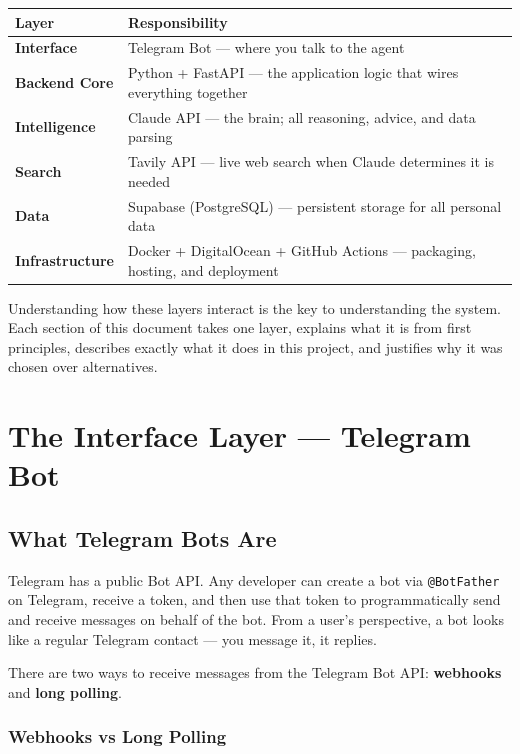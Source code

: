 \documentclass[12pt, a4paper]{article}
\begin{document}
\begin{longtable}{>{\bfseries}p{4cm} p{10cm}}
\toprule
Layer & Responsibility \\
\midrule
Interface & Telegram Bot --- where you talk to the agent \\
\addlinespace
Backend Core & Python + FastAPI --- the application logic that wires everything together \\
\addlinespace
Intelligence & Claude API --- the brain; all reasoning, advice, and data parsing \\
\addlinespace
Search & Tavily API --- live web search when Claude determines it is needed \\
\addlinespace
Data & Supabase (PostgreSQL) --- persistent storage for all personal data \\
\addlinespace
Infrastructure & Docker + DigitalOcean + GitHub Actions --- packaging, hosting, and deployment \\
\bottomrule
\end{longtable}

Understanding how these layers interact is the key to understanding the system. Each section of this document takes one layer, explains what it is from first principles, describes exactly what it does in this project, and justifies why it was chosen over alternatives.

\section{The Interface Layer --- Telegram Bot}

\subsection{What Telegram Bots Are}

Telegram has a public Bot API. Any developer can create a bot via \texttt{@BotFather} on Telegram, receive a token, and then use that token to programmatically send and receive messages on behalf of the bot. From a user's perspective, a bot looks like a regular Telegram contact --- you message it, it replies.

There are two ways to receive messages from the Telegram Bot API: \textbf{webhooks} and \textbf{long polling}.

\subsubsection{Webhooks vs Long Polling}
\end{document}
